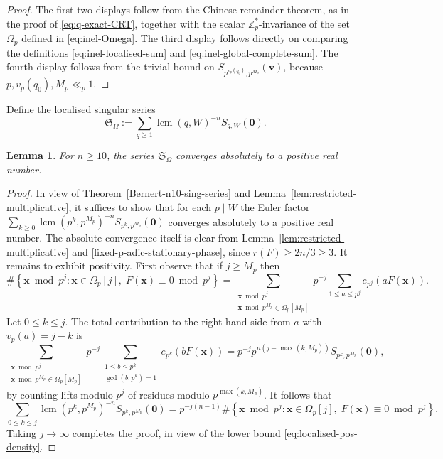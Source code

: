 \documentclass[a4paper,11pt, twoside,reqno]{amsart}
\theoremstyle{plain}
\newtheorem{lemma}[thm]{Lemma}
\theoremstyle{definition}
\theoremstyle{remark}
\newcommand{\bfv}{\bm{v}}
\newcommand{\bfx}{\bm{x}}
\newcommand{\ZZ}{\mathbb{Z}}
\renewcommand{\le}{\leqslant}
\renewcommand{\ge}{\geqslant}
\renewcommand{\geq}{\geqslant}
\newcommand{\lcm}{\operatorname{lcm}}
\numberwithin{equation}{section}
\begin{document}
\begin{proof}
The first two displays follow from the Chinese remainder theorem,
as in the proof of \eqref{eq:q-exact-CRT},
together with the scalar $\ZZ_p^\ast$-invariance of the set $\Omega_p$
defined in \eqref{eq:inel-Omega}.
The third display follows directly on comparing
the definitions \eqref{eq:inel-localised-sum} and \eqref{eq:inel-global-complete-sum}.
The fourth display follows from the trivial bound on $S_{p^{v_p(q_0)},p^{M_p}}(\bfv)$,
because $p,v_p(q_0),M_p\ll_p 1$.
\end{proof}



Define the localised singular series
\begin{equation}\label{eq:localised-singular-series}
\mathfrak S_\Omega := \sum_{q\ge1} \lcm(q,W)^{-n} S_{q,W}(\bm0).
\end{equation}

\begin{lemma}
\label{LEM:localised-singular-series-convergence}
For $n\geq 10$, the series $\mathfrak S_\Omega$ converges absolutely to a positive real number.
\end{lemma}

\begin{proof}
In view of Theorem~\ref{Bernert-n10-sing-series}
and Lemma~\ref{lem:restricted-multiplicative},
it suffices to show that for each $p\mid W$
the Euler factor $\sum_{k\ge 0} \lcm(p^k,p^{M_p})^{-n} S_{p^k,p^{M_p}}(\bm0)$
converges absolutely to a positive real number.
The absolute convergence itself is clear from Lemma~\ref{lem:restricted-multiplicative}
and \eqref{fixed-p-adic-stationary-phase}, since $r(F) \ge 2n/3 \ge 3$.
It remains to exhibit positivity.
First observe that if $j\ge M_p$ then
\begin{equation*}
\#\left\{\bfx\bmod p^j:
\bfx\in\Omega_p[j],\;F(\bfx)\equiv0\bmod{p^j}\right\}
= \sum_{\substack{\bfx\bmod{p^j} \\ \bfx\bmod p^{M_p}\in\Omega_p[M_p]}}
p^{-j} \sum_{1\le a\le p^j} e_{p^j}(aF(\bfx)).
\end{equation*}
Let $0\le k\le j$.
The total contribution to the right-hand side
from $a$ with $v_p(a) = j-k$ is
\begin{equation*}
\sum_{\substack{\bfx\bmod{p^j} \\ \bfx\bmod p^{M_p}\in\Omega_p[M_p]}}
p^{-j} \sum_{\substack{1\le b\le p^k \\ \gcd(b,p^k)=1}} e_{p^k}(bF(\bfx))
= p^{-j} p^{n(j-\max(k,M_p))} S_{p^k,p^{M_p}}(\bm0),
\end{equation*}
by counting lifts modulo $p^j$ of residues modulo
$p^{\max(k,M_p)}$.
It follows that
\begin{equation*}
\sum_{0\le k\le j} \lcm(p^k,p^{M_p})^{-n} S_{p^k,p^{M_p}}(\bm0)
= p^{-j(n-1)}
\#\left\{\bfx\bmod p^j:
\bfx\in\Omega_p[j],\;F(\bfx)\equiv0\bmod{p^j}\right\}.
\end{equation*}
Taking $j\to \infty$ completes the proof,
in view of the lower bound \eqref{eq:localised-pos-density}.
\end{proof}
\end{document}
